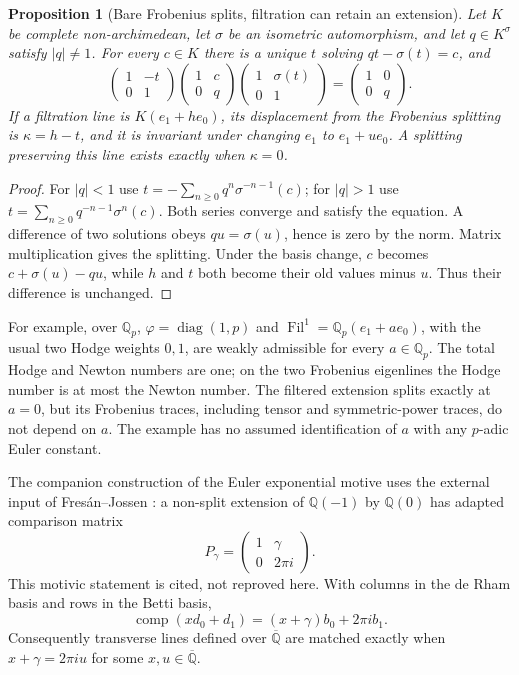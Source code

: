 \documentclass[11pt,a4paper]{article}
\newcommand{\Q}{\mathbb Q}
\newcommand{\Qbar}{\overline{\mathbb Q}}
\newtheorem{proposition}[theorem]{Proposition}
\theoremstyle{definition}
\theoremstyle{remark}
\numberwithin{equation}{section}
\begin{document}
\begin{proposition}[Bare Frobenius splits, filtration can retain an extension]
\label{fd:prop:frobenius}
Let $K$ be complete non-archimedean, let $\sigma$ be an isometric
automorphism, and let $q\in K^\sigma$ satisfy $|q|\ne1$.  For every
$c\in K$ there is a unique $t$ solving $qt-\sigma(t)=c$, and
\[
 \begin{pmatrix}1&-t\\0&1\end{pmatrix}
 \begin{pmatrix}1&c\\0&q\end{pmatrix}
 \begin{pmatrix}1&\sigma(t)\\0&1\end{pmatrix}
 =\begin{pmatrix}1&0\\0&q\end{pmatrix}.
\]
If a filtration line is $K(e_1+h e_0)$, its displacement from the
Frobenius splitting is $\kappa=h-t$, and it is invariant under changing
$e_1$ to $e_1+u e_0$.  A splitting preserving this line exists exactly
when $\kappa=0$.
\end{proposition}
\begin{proof}
For $|q|<1$ use $t=-\sum_{n\ge0}q^n\sigma^{-n-1}(c)$; for $|q|>1$
use $t=\sum_{n\ge0}q^{-n-1}\sigma^n(c)$.  Both series converge and
satisfy the equation.  A difference of two solutions obeys
$qu=\sigma(u)$, hence is zero by the norm.  Matrix multiplication gives
the splitting.  Under the basis change, $c$ becomes
$c+\sigma(u)-qu$, while $h$ and $t$ both become their old values minus
$u$.  Thus their difference is unchanged.
\end{proof}

For example, over $\Q_p$, $\varphi=\operatorname{diag}(1,p)$ and
$\operatorname{Fil}^1=\Q_p(e_1+a e_0)$, with the usual two Hodge weights
$0,1$, are weakly admissible for every $a\in\Q_p$.  The total Hodge and
Newton numbers are one; on the two Frobenius eigenlines the Hodge number
is at most the Newton number.  The filtered extension splits exactly at
$a=0$, but its Frobenius traces, including tensor and symmetric-power
traces, do not depend on $a$.  The example has no assumed identification
of $a$ with any $p$-adic Euler constant.

The companion construction of the Euler exponential motive uses the
external input of Fres\'an--Jossen \cite[\S12.8]{fd:FJ}: a non-split
extension of $\Q(-1)$ by $\Q(0)$ has adapted comparison matrix
\[
 P_\gamma=\begin{pmatrix}1&\gamma\\0&2\pi i\end{pmatrix}.
\]
This motivic statement is cited, not reproved here.  With columns in the
de Rham basis and rows in the Betti basis,
\[
 \operatorname{comp}(xd_0+d_1)=(x+\gamma)b_0+2\pi i b_1.
\]
Consequently transverse lines defined over $\Qbar$ are matched exactly
when $x+\gamma=2\pi i u$ for some $x,u\in\Qbar$.
\end{document}
